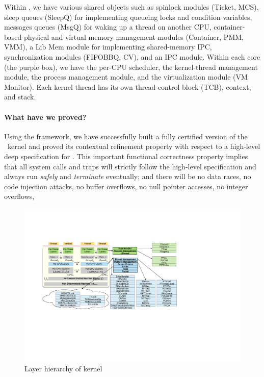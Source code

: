 Within \cCTOS, we have various shared objects such as spinlock modules
(Ticket, MCS), sleep queues (SleepQ) for implementing queueing locks
and condition variables, messages queues (MsgQ) for waking up a
thread on another CPU, container-based physical and virtual memory
management modules (Container, PMM, VMM), a Lib Mem module for
implementing shared-memory IPC, synchronization modules (FIFOBBQ,
CV), and an IPC module. Within each core (the purple box), we have
the per-CPU scheduler, the kernel-thread management module, the process
management module, and the virtualization module (VM Monitor). Each
kernel thread has its own thread-control block (TCB), context, and stack.

\paragraph{What have we proved?}
Using the \CTOS{} framework, we have successfully built a fully certified version of
the \cCTOS\ kernel and proved its contextual refinement property with
respect to a high-level deep specification for \cCTOS.  This important
functional correctness property implies that all system calls and
traps will strictly follow the high-level specification and always run
{\em safely} and {\em terminate} eventually; and there will be no data
races, no code injection attacks, no buffer overflows, no null pointer
accesses, no integer overflows, \etc{}

\begin{figure}[t]
\includegraphics[width=1.0\textwidth]{figs/layer_diagram.pdf}
\caption{Layer hierarchy of \cCTOS{} kernel}
\label{fig:layer_diagram}
\hrulefill
\end{figure}

